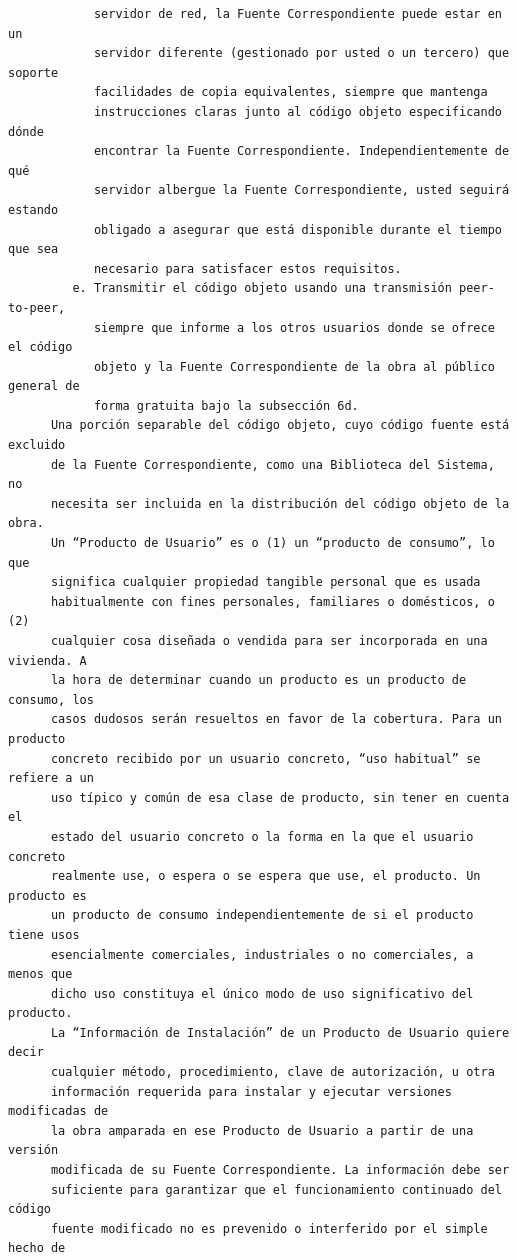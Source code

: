 \begin{verbatim}
            servidor de red, la Fuente Correspondiente puede estar en un
            servidor diferente (gestionado por usted o un tercero) que soporte
            facilidades de copia equivalentes, siempre que mantenga
            instrucciones claras junto al código objeto especificando dónde
            encontrar la Fuente Correspondiente. Independientemente de qué
            servidor albergue la Fuente Correspondiente, usted seguirá estando
            obligado a asegurar que está disponible durante el tiempo que sea
            necesario para satisfacer estos requisitos.
         e. Transmitir el código objeto usando una transmisión peer-to-peer,
            siempre que informe a los otros usuarios donde se ofrece el código
            objeto y la Fuente Correspondiente de la obra al público general de
            forma gratuita bajo la subsección 6d.
      Una porción separable del código objeto, cuyo código fuente está excluido
      de la Fuente Correspondiente, como una Biblioteca del Sistema, no
      necesita ser incluida en la distribución del código objeto de la obra.
      Un “Producto de Usuario” es o (1) un “producto de consumo”, lo que
      significa cualquier propiedad tangible personal que es usada
      habitualmente con fines personales, familiares o domésticos, o (2)
      cualquier cosa diseñada o vendida para ser incorporada en una vivienda. A
      la hora de determinar cuando un producto es un producto de consumo, los
      casos dudosos serán resueltos en favor de la cobertura. Para un producto
      concreto recibido por un usuario concreto, “uso habitual” se refiere a un
      uso típico y común de esa clase de producto, sin tener en cuenta el
      estado del usuario concreto o la forma en la que el usuario concreto
      realmente use, o espera o se espera que use, el producto. Un producto es
      un producto de consumo independientemente de si el producto tiene usos
      esencialmente comerciales, industriales o no comerciales, a menos que
      dicho uso constituya el único modo de uso significativo del producto.
      La “Información de Instalación” de un Producto de Usuario quiere decir
      cualquier método, procedimiento, clave de autorización, u otra
      información requerida para instalar y ejecutar versiones modificadas de
      la obra amparada en ese Producto de Usuario a partir de una versión
      modificada de su Fuente Correspondiente. La información debe ser
      suficiente para garantizar que el funcionamiento continuado del código
      fuente modificado no es prevenido o interferido por el simple hecho de

\end{verbatim}
